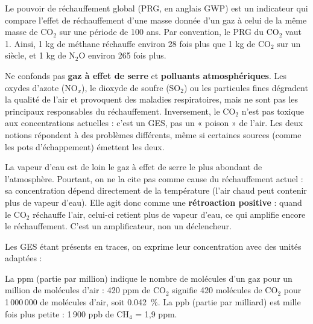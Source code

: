 \documentclass[11pt]{article}
\newcommand{\cle}[1]{{\popxbold\color{popdark}#1}}
\newcounter{popsec}
\newcounter{popsub}
\newcommand{\courssub}[1]{%
  \stepcounter{popsub}%
  \par\vspace{9pt}\noindent{\popxbold\fontsize{11.5}{13}\selectfont\color{popink}{\color{poporange}\thepopsec.\thepopsub}\hspace{6pt}#1}\par\nopagebreak\vspace{4pt}
}
\begin{document}
\begin{propriete}
Le \cle{pouvoir de réchauffement global} (PRG, en anglais GWP) est un indicateur qui compare l'effet de réchauffement d'une masse donnée d'un gaz à celui de la même masse de CO$_2$ sur une période de 100 ans. Par convention, le PRG du CO$_2$ vaut 1. Ainsi, 1 kg de méthane réchauffe environ 28 fois plus que 1 kg de CO$_2$ sur un siècle, et 1 kg de N$_2$O environ 265 fois plus.
\end{propriete}

\begin{attention}
Ne confonds pas \textbf{gaz à effet de serre} et \textbf{polluants atmosphériques}. Les oxydes d'azote (NO$_x$), le dioxyde de soufre (SO$_2$) ou les particules fines dégradent la qualité de l'air et provoquent des maladies respiratoires, mais ne sont pas les principaux responsables du réchauffement. Inversement, le CO$_2$ n'est pas toxique aux concentrations actuelles : c'est un GES, pas un « poison » de l'air. Les deux notions répondent à des problèmes différents, même si certaines sources (comme les pots d'échappement) émettent les deux.
\end{attention}

\begin{savaistu}
La vapeur d'eau est de loin le gaz à effet de serre le plus abondant de l'atmosphère. Pourtant, on ne la cite pas comme cause du réchauffement actuel : sa concentration dépend directement de la température (l'air chaud peut contenir plus de vapeur d'eau). Elle agit donc comme une \textbf{rétroaction positive} : quand le CO$_2$ réchauffe l'air, celui-ci retient plus de vapeur d'eau, ce qui amplifie encore le réchauffement. C'est un amplificateur, non un déclencheur.
\end{savaistu}

\courssub{Mesurer les GES : les unités ppm et ppb}

Les GES étant présents en traces, on exprime leur concentration avec des unités adaptées :

\begin{definition}
La \cle{ppm} (partie par million) indique le nombre de molécules d'un gaz pour un million de molécules d'air : 420 ppm de CO$_2$ signifie 420 molécules de CO$_2$ pour 1\,000\,000 de molécules d'air, soit \SI{0,042}{\percent}. La \cle{ppb} (partie par milliard) est mille fois plus petite : 1\,900 ppb de CH$_4$ = 1,9 ppm.
\end{definition}
\end{document}
